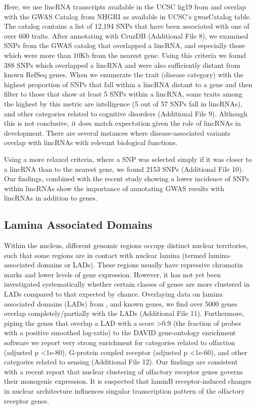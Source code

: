 \documentclass[10pt]{bmc_article}
\newenvironment{bmcformat}{\baselineskip20pt\sloppy\setboolean{publ}{false}}{\baselineskip20pt\sloppy}
\begin{document}
\begin{bmcformat}
Here, we use lincRNA transcripts available in the UCSC hg19 from \cite{Cabili} and overlap  with the GWAS Catalog from NHGRI \cite{Hindorff} as available in UCSC's gwasCatalog table. The catalog contains a list of 12,194 SNPs that have been associated with one of over 600 traits. After annotating with CruzDB (Additional File 8), we examined SNPs from the GWAS catalog that overlapped a lincRNA, and especially those which were more than 10Kb from the nearest gene. Using this criteria we found 388 SNPs which overlapped a lincRNA and were also sufficiently distant from known RefSeq genes. When we enumerate the trait (disease category) with the highest proportion of SNPs that fall within a lincRNA distant to a gene and then filter to those that show at least 5 SNPs within a lincRNA, some traits among the highest by this metric are intelligence (5 out of 57 SNPs fall in lincRNAs), and other categories related to cognitive disorders (Additional File 9). Although this is not conclusive, it does match expectation given the role of lincRNAs in development. There are several instances where disease-associated variants overlap with lincRNAs with relevant biological functions. 

Using a more relaxed criteria, where a SNP was selected simply if it was closer to a lincRNA than to the nearest gene, we found 2153 SNPs (Additional File 10). Our findings, combined with the recent study showing a lower incidence of SNPs within lincRNAs \cite{Chen} show the importance of annotating GWAS results with lincRNAs in addition to genes.

\subsection*{Lamina Associated Domains}
Within the nucleus, different genomic regions occupy distinct nuclear territories, such that some regions are in contact with nuclear lamina (termed lamina-associated domains or LADs). These regions usually have repressive chromatin marks and lower levels of gene expression. However, it has not yet been investigated systematically whether certain classes of genes are more clustered in LADs compared to that expected by chance. Overlaying data on lamina associated domains (LADs) from \cite{Guelen}, and known genes, we find over 5000 genes overlap completely/partially with the LADs (Additional File 11). Furthermore, piping the genes that overlap a LAD with a score \textgreater 0.9 (the fraction of probes with a positive smoothed log-ratio) to the DAVID gene-ontology enrichment software \cite{Huang} we report very strong enrichment for categories related to olfaction (adjusted p \textless 1e-80), G-protein coupled receptor (adjusted p \textless 1e-60), and other categories related to sensing (Additional File 12).  Our findings are consistent with a recent report \cite{Clowney} that nuclear clustering of olfactory receptor genes governs their monogenic expression. It is suspected that laminB receptor-induced changes in nuclear architecture influences singular transcription pattern of the olfactory receptor genes.


\end{bmcformat}
\end{document}
